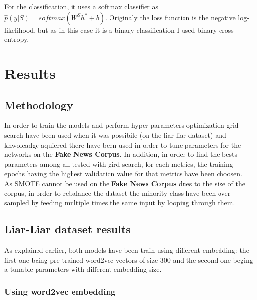 For the classification, it uses a softmax classifier as $\hat{p}(y|S) = softmax(W^Sh^* + b)$. Originaly the loss function is the negative log-likelihood, but as in this case it is a binary classification I used binary cross entropy. 
\section{Results}
\subsection{Methodology}
In order to train the models and perform hyper parameters optimization grid search have been used when it was possibile (on the liar-liar dataset) and knwoleadge aquiered there have been used in order to tune parameters for the networks on the \textbf{Fake News Corpus}. In addition, in order to find the bests parameters among all tested with gird search, for each metrics, the training epochs having the highest validation value for that metrics have been choosen. \\

As SMOTE cannot be used on the \textbf{Fake News Corpus} dues to the size of the corpus, in order to rebalance the dataset the minority class have been over sampled by feeding multiple times the same input by looping through them. 
\subsection{Liar-Liar dataset results}
As explained earlier, both models have been train using different embedding: the first one being pre-trained word2vec vectors of size 300 and the second one beging a tunable parameters with different embedding size.
\subsubsection{Using word2vec embedding}
